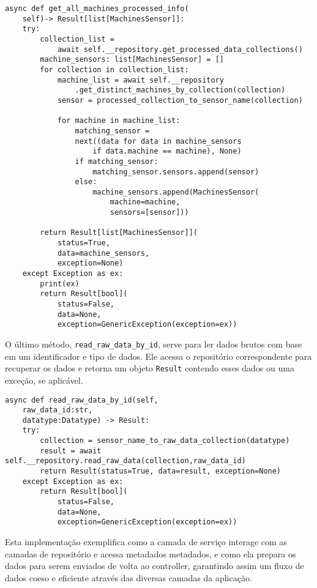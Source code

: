 \begin{verbatim}
async def get_all_machines_processed_info(
    self)-> Result[list[MachinesSensor]]:
    try:
        collection_list = 
            await self.__repository.get_processed_data_collections()
        machine_sensors: list[MachinesSensor] = []
        for collection in collection_list:
            machine_list = await self.__repository
                .get_distinct_machines_by_collection(collection)
            sensor = processed_collection_to_sensor_name(collection)

            for machine in machine_list:
                matching_sensor = 
                next((data for data in machine_sensors 
                    if data.machine == machine), None)
                if matching_sensor:
                    matching_sensor.sensors.append(sensor)
                else:
                    machine_sensors.append(MachinesSensor(
                        machine=machine,
                        sensors=[sensor]))
        
        return Result[list[MachinesSensor]](
            status=True,
            data=machine_sensors,
            exception=None)
    except Exception as ex:
        print(ex)
        return Result[bool](
            status=False,
            data=None,
            exception=GenericException(exception=ex)) 
\end{verbatim}

O último método, \texttt{read\_raw\_data\_by\_id}, serve para ler dados brutos com base em um identificador e tipo de dados. Ele acessa o repositório correspondente para recuperar os dados e retorna um objeto \texttt{Result} contendo esses dados ou uma exceção, se aplicável.
\begin{verbatim}
async def read_raw_data_by_id(self,
    raw_data_id:str,
    datatype:Datatype) -> Result:
    try:
        collection = sensor_name_to_raw_data_collection(datatype)
        result = await self.__repository.read_raw_data(collection,raw_data_id)
        return Result(status=True, data=result, exception=None) 
    except Exception as ex:
        return Result[bool](
            status=False,
            data=None,
            exception=GenericException(exception=ex)) 

\end{verbatim}
Esta implementação exemplifica como a camada de serviço interage com as camadas de repositório e acessa metadados metadados, e como ela prepara os dados para serem enviados de volta ao controller, garantindo assim um fluxo de dados coeso e eficiente através das diversas camadas da aplicação.

